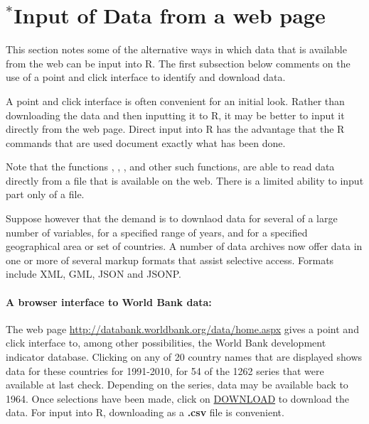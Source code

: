 \section{$^*$Input of  Data from a web page}

This section notes some of the alternative ways in which data that is
available from the web can be input into R.  The first subsection
below comments on the use of a point and click interface to identify
and download data.

A point and click interface is often convenient for an initial look.
Rather than downloading the data and then inputting it to R, it may be
better to input it directly from the web page.  Direct input into R
has the advantage that the R commands that are used document exactly
what has been done.

Note that the functions , ,
, and other such functions, are able to read data
directly from a file that is available on the web.  There is a
limited ability to input part only of a file.

Suppose however that the demand is to downlaod data for several of a
large number of variables, for a specified range of years, and for a
specified geographical area or set of countries.    A number of data
archives now offer data in one or more of several markup formats that
assist selective access. Formats include XML, GML, JSON and JSONP.

\paragraph{A browser interface to World Bank data:}
The web page
\url{http://databank.worldbank.org/data/home.aspx} gives a point and click
interface to, among other possibilities, the World Bank development
indicator database.  Clicking on any of 20 country names that are
displayed shows data for these countries for 1991-2010, for 54 of the
1262 series that were available at last check.  Depending on the
series, data may be available back to 1964.  Once selections have been
made, click on \underline{DOWNLOAD} to download the data.  For input
into R, downloading as a {\bf .csv} file is convenient.

